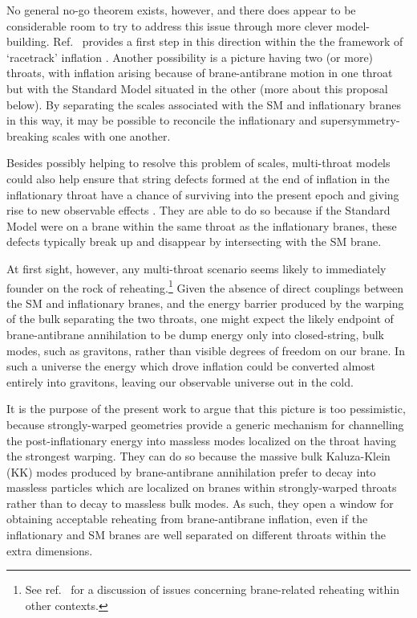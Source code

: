 \documentclass[12pt]{JHEP3}
\begin{document}
No general no-go theorem exists, however, and there does appear to
be considerable room to try to address this issue through more
clever model-building. Ref.~\cite{RA} provides a first step in
this direction within the the framework of `racetrack' inflation
\cite{racetrackinflation}. Another possibility is a picture having
two (or more) throats, with inflation arising because of
brane-antibrane motion in one throat but with the Standard Model
situated in the other (more about this proposal below). By
separating the scales associated with the SM and inflationary
branes in this way, it may be possible to reconcile the
inflationary and supersymmetry-breaking scales with one another.

Besides possibly helping to resolve this problem of scales,
multi-throat models could also help ensure that string defects
formed at the end of inflation in the inflationary throat have a
chance of surviving into the present epoch and giving rise to new
observable effects \cite{stringycosmicstrings}. They are able to
do so because if the Standard Model were on a brane within the
same throat as the inflationary branes, these defects typically
break up and disappear by intersecting with the SM brane.

At first sight, however, any multi-throat scenario seems likely to
immediately founder on the rock of reheating.\footnote{See
ref.~\cite{braneheat} for a discussion of issues concerning
brane-related reheating within other contexts.} Given the absence
of direct couplings between the SM and inflationary branes, and
the energy barrier produced by the warping of the bulk separating
the two throats, one might expect the likely endpoint of
brane-antibrane annihilation to be dump energy only into
closed-string, bulk modes, such as gravitons, rather than visible
degrees of freedom on our brane. In such a universe the energy
which drove inflation could be converted almost entirely into
gravitons, leaving our observable universe out in the cold.

It is the purpose of the present work to argue that this picture
is too pessimistic, because strongly-warped geometries provide a
generic mechanism for channelling the post-inflationary energy
into massless modes localized on the throat having the strongest
warping. They can do so because the massive bulk Kaluza-Klein (KK)
modes produced by brane-antibrane annihilation prefer to decay
into massless particles which are localized on branes within
strongly-warped throats rather than to decay to massless bulk
modes. As such, they open a window for obtaining acceptable
reheating from brane-antibrane inflation, even if the inflationary
and SM branes are well separated on different throats within the
extra dimensions.
\end{document}

